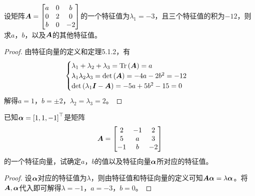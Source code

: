 \begin{problem}
设矩阵\(\boldsymbol{A}=\begin{bmatrix}a&0&b\\0&2&0\\b&0&-2\end{bmatrix}\)的一个特征值为\(\lambda_1=-3\)，且三个特征值的积为\(-12\)，则求\(a\)，\(b\)，以及\(\boldsymbol{A}\)的其他特征值。
\end{problem}
\begin{proof}
    由特征向量的定义和定理5.1.2，有
    \begin{equation*}
        \begin{cases}
            \lambda_1+\lambda_2+\lambda_3=\mathrm{Tr}\left( \boldsymbol{A} \right)=a        \\
            \lambda_1\lambda_2\lambda_3=\mathrm{det}\left( \boldsymbol{A} \right)=-4a-2b^2=-12 \\
            \mathrm{det}\left( \lambda_1\boldsymbol{I}-\boldsymbol{A} \right)=-5a+5b^2-15=0
        \end{cases}
    \end{equation*}
    解得\(a=1\)，\(b=\pm2\)，\(\lambda_2=\lambda_3=2\)。
\end{proof}

\begin{problem}
已知\(\boldsymbol{\alpha}=\left[ 1,1,-1 \right]^\top\)是矩阵
\begin{equation*}
    \boldsymbol{A}=
    \begin{bmatrix}
        2  & -1 & 2  \\
        5  & a  & 3  \\
        -1 & b  & -2
    \end{bmatrix}
\end{equation*}
的一个特征向量，试确定\(a\)，\(b\)的值以及特征向量\(\boldsymbol{\alpha}\)所对应的特征值。
\end{problem}
\begin{proof}
    设\(\boldsymbol{\alpha}\)对应的特征值为\(\lambda\)，则由特征值和特征向量的定义可知\(\boldsymbol{A}\boldsymbol{\alpha}=\lambda\boldsymbol{\alpha}\)。将\(\boldsymbol{A},\boldsymbol{\alpha}\)代入即可解得\(\lambda=-1\)，\(a=-3\)，\(b=0\)。
\end{proof}

